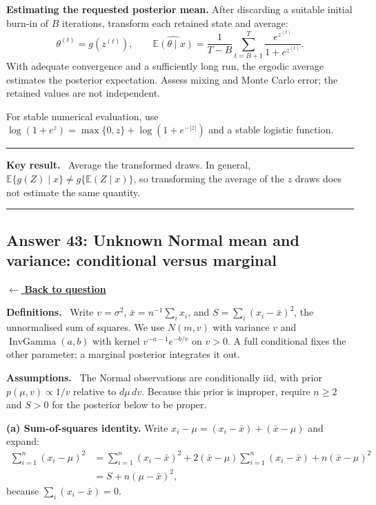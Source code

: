 \documentclass[11pt,a4paper]{article}
\newcommand{\given}{\mathrel{|}}
\DeclareMathOperator{\InvGamma}{InvGamma}
\newcommand{\E}{\mathbb{E}}
\newcommand{\answernav}[1]{%
  \label{answer:#1}%
  \noindent\hyperref[question:#1]{$\leftarrow$ \textbf{Back to question}}%
  \par\smallskip}
\newcommand{\studyheading}[1]{%
  \par\medskip\noindent\textcolor{statblue}{\textbf{#1.}}\ }
\newenvironment{keyresult}
  {\begin{center}\begin{minipage}{0.92\linewidth}\color{statblue}%
   \hrule\vspace{6pt}\textbf{Key result.}\ }
  {\vspace{6pt}\hrule\end{minipage}\end{center}}
\begin{document}
\textbf{Estimating the requested posterior mean.}
After discarding a suitable initial burn-in of $B$ iterations, transform
each retained state and average:
\[
\theta^{(t)}=g(z^{(t)}),
\qquad
\boxed{
\widehat{\E(\theta\given x)}
=\frac1{T-B}\sum_{t=B+1}^T\frac{e^{z^{(t)}}}{1+e^{z^{(t)}}}
}.
\]
With adequate convergence and a sufficiently long run, the ergodic
average estimates the posterior expectation. Assess mixing and Monte
Carlo error; the retained values are not independent.

For stable numerical evaluation, use
$\log(1+e^z)=\max\{0,z\}+\log(1+e^{-|z|})$ and a stable logistic function.

\begin{keyresult}
Average the transformed draws. In general,
$\E\{g(Z)\given x\}\ne g\{\E(Z\given x)\}$, so transforming the average
of the $z$ draws does not estimate the same quantity.
\end{keyresult}

\clearpage

\subsection{Answer 43: Unknown Normal mean and variance: conditional versus marginal}
\answernav{43}

\studyheading{Definitions}
Write $v=\sigma^2$, $\bar x=n^{-1}\sum_i x_i$, and
$S=\sum_i(x_i-\bar x)^2$, the unnormalised sum of squares.
We use $N(m,v)$ with variance $v$ and
$\InvGamma(a,b)$ with kernel $v^{-a-1}e^{-b/v}$ on $v>0$.
A full conditional fixes the other parameter; a marginal posterior integrates it out.

\studyheading{Assumptions}
The Normal observations are conditionally iid, with prior
$p(\mu,v)\propto1/v$ relative to $d\mu\,dv$.
Because this prior is improper, require $n\ge2$ and $S>0$ for the posterior below to be proper.

\textbf{(a) Sum-of-squares identity.}
Write $x_i-\mu=(x_i-\bar x)+(\bar x-\mu)$ and expand:
\begin{align*}
\sum_{i=1}^n(x_i-\mu)^2
&=\sum_{i=1}^n(x_i-\bar x)^2
+2(\bar x-\mu)\sum_{i=1}^n(x_i-\bar x)
+n(\bar x-\mu)^2\\
&=\boxed{S+n(\mu-\bar x)^2},
\end{align*}
because $\sum_i(x_i-\bar x)=0$.
\end{document}
